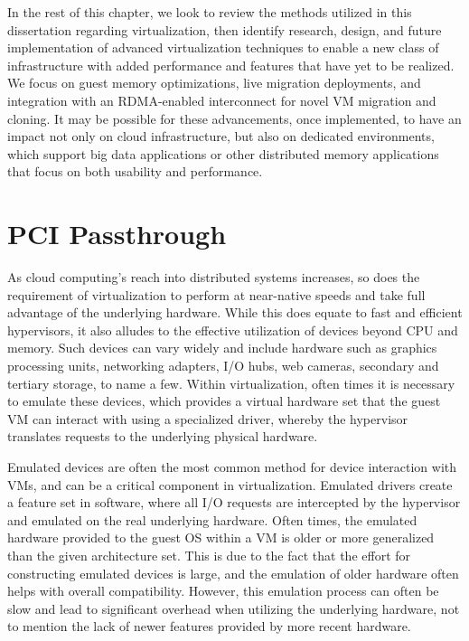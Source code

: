 In the rest of this chapter, we look to review the methods utilized in this dissertation regarding virtualization, then identify research, design, and future implementation of advanced virtualization techniques to enable a new class of infrastructure with added performance and features that have yet to be realized.  We focus on guest memory optimizations, live migration deployments, and integration with an RDMA-enabled interconnect for novel VM migration and cloning.  It may be possible for these advancements, once implemented, to have an impact not only on cloud infrastructure, but also on dedicated environments, which support big data applications or other distributed memory applications that focus on both usability and performance.


\section{PCI Passthrough}

As cloud computing's reach into distributed systems increases, so does the requirement of virtualization to perform at near-native speeds and take full advantage of the underlying hardware. While this does equate to fast and efficient hypervisors, it also alludes to the effective utilization of devices beyond CPU and memory.  Such devices can vary widely and include hardware such as graphics processing units, networking adapters,  I/O hubs, web cameras, secondary and tertiary storage, to name a few. Within virtualization, often times it is necessary to emulate these devices, which provides a virtual hardware set that the guest VM can interact with using a specialized driver, whereby the hypervisor translates requests to the underlying physical hardware.

Emulated devices are often the most common method for device interaction with VMs, and can be a critical component in virtualization. Emulated drivers create a feature set in software, where all I/O requests are intercepted by the hypervisor and emulated on the real underlying hardware. Often times, the emulated hardware provided to the guest OS within a VM is older or more generalized than the given architecture set. This is due to the fact that the effort for constructing emulated devices is large, and the emulation of older hardware often helps with overall compatibility. However, this emulation process can often be slow and  lead to significant overhead when utilizing the underlying hardware, not to mention the lack of newer features provided by more recent hardware.

